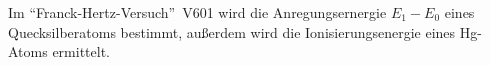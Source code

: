 Im \textquotedblleft Franck-Hertz-Versuch\textquotedblright \, V601 wird die Anregungsernergie $E_{1}- E_{0}$ eines Quecksilberatoms bestimmt, außerdem wird die Ionisierungsenergie eines Hg-Atoms ermittelt.
